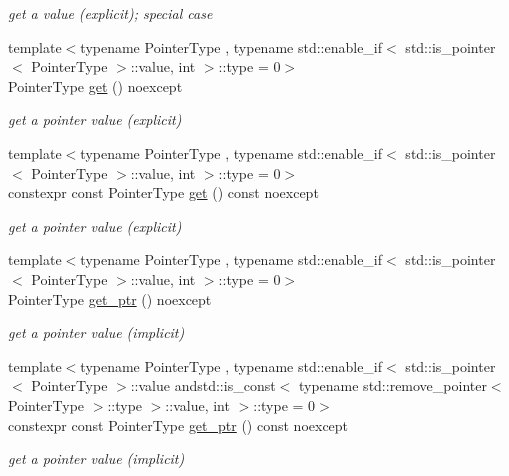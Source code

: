 \begin{DoxyCompactItemize}
\begin{DoxyCompactList}\small\item\em get a value (explicit); special case \end{DoxyCompactList}\item 
{\footnotesize template$<$typename Pointer\+Type , typename std\+::enable\+\_\+if$<$ std\+::is\+\_\+pointer$<$ Pointer\+Type $>$\+::value, int $>$\+::type  = 0$>$ }\\Pointer\+Type \hyperlink{classnlohmann_1_1basic__json_a64135c19425f00b346d8ed63a23db334}{get} () noexcept
\begin{DoxyCompactList}\small\item\em get a pointer value (explicit) \end{DoxyCompactList}\item 
{\footnotesize template$<$typename Pointer\+Type , typename std\+::enable\+\_\+if$<$ std\+::is\+\_\+pointer$<$ Pointer\+Type $>$\+::value, int $>$\+::type  = 0$>$ }\\constexpr const Pointer\+Type \hyperlink{classnlohmann_1_1basic__json_a44a090c15a67b9f02e579b6e17ef0e1b}{get} () const noexcept
\begin{DoxyCompactList}\small\item\em get a pointer value (explicit) \end{DoxyCompactList}\item 
{\footnotesize template$<$typename Pointer\+Type , typename std\+::enable\+\_\+if$<$ std\+::is\+\_\+pointer$<$ Pointer\+Type $>$\+::value, int $>$\+::type  = 0$>$ }\\Pointer\+Type \hyperlink{classnlohmann_1_1basic__json_aefa46bd2d96bb77a38d1c8b431eab44f}{get\+\_\+ptr} () noexcept
\begin{DoxyCompactList}\small\item\em get a pointer value (implicit) \end{DoxyCompactList}\item 
{\footnotesize template$<$typename Pointer\+Type , typename std\+::enable\+\_\+if$<$ std\+::is\+\_\+pointer$<$ Pointer\+Type $>$\+::value andstd\+::is\+\_\+const$<$ typename std\+::remove\+\_\+pointer$<$ Pointer\+Type $>$\+::type $>$\+::value, int $>$\+::type  = 0$>$ }\\constexpr const Pointer\+Type \hyperlink{classnlohmann_1_1basic__json_a14abd48803a8d5447faf5f583fa8e2a1}{get\+\_\+ptr} () const noexcept
\begin{DoxyCompactList}\small\item\em get a pointer value (implicit) \end{DoxyCompactList}\item 

\end{DoxyCompactItemize}
